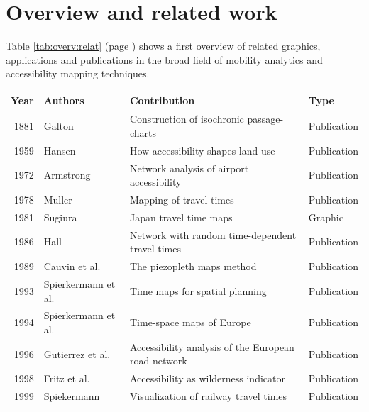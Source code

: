 
\cleardoublepage
\chapter{Overview and related work}
  \label{chap:overv}

  Table \ref{tab:overv:relat} (page \pageref{tab:overv:relat}) shows a first
  overview of related graphics, applications and publications in the broad
  field of mobility analytics and accessibility mapping techniques.\par

  \begin{table}[htp]
    \tiny \centering
    \begin{tabular}{r|l|l|l}
     \textbf{Year} & \textbf{Authors} & \textbf{Contribution} & \textbf{Type} \\
     \hline
      1881 & Galton \cite{galton1881construction} & Construction of isochronic passage-charts  & Publication  \\
      1959 & Hansen \cite{hansen1959accessibility} & How accessibility shapes land use & Publication \\
      1972 & Armstrong \cite{armstrong1972network} & Network analysis of airport accessibility  & Publication  \\
      1978 & Muller \cite{muller1978mapping} & Mapping of travel times  & Publication  \\
      1981 & Sugiura \cite{Sugiura1981} & Japan travel time maps  & Graphic  \\
      1986 & Hall \cite{hall1986fastest} & Network with random time-dependent travel times  &  Publication \\
      1989 & Cauvin et al. \cite{cauvin1989cartographic} & The piezopleth maps method  & Publication  \\
      1993 & Spierkermann et al. \cite{spiekermann1993zeitkarten} & Time maps for spatial planning  & Publication  \\
      1994 & Spierkermann et al. \cite{spiekermann1994new} & Time-space maps of Europe  & Publication  \\
      1996 & Gutierrez et al. \cite{gutierrez1996accessibility} & Accessibility analysis of the European road network  & Publication  \\
      1998 & Fritz et al. \cite{fritz1998accessibility} &  Accessibility as wilderness indicator  & Publication  \\
      1999 & Spiekermann \cite{spiekermann1999visualisierung} & Visualization of railway travel times & Publication \\

\end{tabular}
\end{table}
